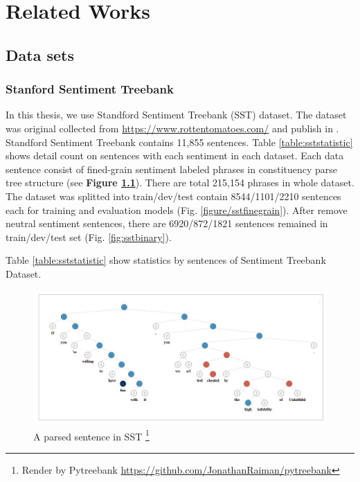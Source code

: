 \chapter{Related Works}

\section{Data sets}
\subsection{Stanford Sentiment Treebank} \label{sec:sst}
In this thesis, we use Standford Sentiment Treebank (SST) dataset\cite{socher2013recursive}. The dataset was original collected from \url{https://www.rottentomatoes.com/} and publish in \cite{pang2002thumbs}. Standford Sentiment Treebank contains 11,855 sentences. Table \ref{table:sststatistic} shows detail count on sentences with each sentiment in each dataset. Each data sentence consist of fined-grain sentiment labeled phrases in constituency parse tree structure (see \textbf{Figure \ref{fig:sst}}). There are total 215,154 phrases in whole dataset. 
The dataset was splitted into train/dev/test contain 8544/1101/2210 sentences each for training and evaluation models (Fig. \ref{figure/sstfinegrain}). After remove neutral sentiment sentences, there are 6920/872/1821 sentences remained in train/dev/test set (Fig. \ref{fig:sstbinary}).

Table \ref{table:sststatistic} show statistics by sentences of Sentiment Treebank Dataset.

\begin{figure}[H]
	\begin{minipage}{\textwidth}
		\centering
		\includegraphics[width=0.9\linewidth]{figure/sst}
		\caption[A parsed sentence in SST]{A parsed sentence in SST \footnote{Render by Pytreebank \url{https://github.com/JonathanRaiman/pytreebank}}}
		\label{fig:sst}
	\end{minipage}
\end{figure}

